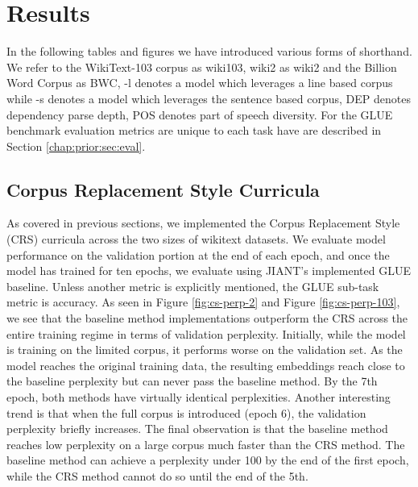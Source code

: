 \chapter{Results}
\label{chap:results}
In the following tables and figures we have introduced various forms of shorthand. We refer to the WikiText-103 corpus as wiki103, wiki2 as wiki2 and the Billion Word Corpus as BWC, -l denotes a model which leverages a line based corpus while -s denotes a model which leverages the sentence based corpus, DEP denotes dependency parse depth, POS denotes part of speech diversity. For the GLUE benchmark evaluation metrics are unique to each task have are described in Section \ref{chap:prior:sec:eval}. 
\section{Corpus Replacement Style Curricula}
\label{chap:results:secBS}
As covered in previous sections, we implemented the Corpus Replacement Style (CRS) curricula across the two sizes of wikitext datasets. We evaluate model performance on the validation portion at the end of each epoch, and once the model has trained for ten epochs, we evaluate using JIANT's \cite{Pruksachatkun2020jiantAS} implemented GLUE baseline. Unless another metric is explicitly mentioned, the GLUE sub-task metric is accuracy.
As seen in Figure \ref{fig:cs-perp-2} and Figure \ref{fig:cs-perp-103}, we see that the baseline method implementations outperform the CRS across the entire training regime in terms of validation perplexity. Initially, while the model is training on the limited corpus, it performs worse on the validation set. As the model reaches the original training data, the resulting embeddings reach close to the baseline perplexity but can never pass the baseline method. By the 7th epoch, both methods have virtually identical perplexities. Another interesting trend is that when the full corpus is introduced (epoch 6), the validation perplexity briefly increases. The final observation is that the baseline method reaches low perplexity on a large corpus much faster than the CRS method. The baseline method can achieve a perplexity under 100 by the end of the first epoch, while the CRS method cannot do so until the end of the 5th. \\
